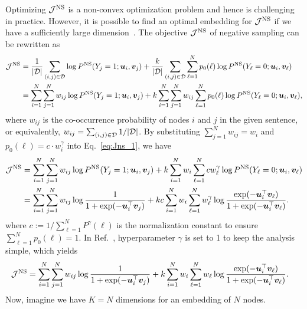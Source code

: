 \documentclass[12pt]{article} %
\def\vec#1{{\bm #1}}
\begin{document}
Optimizing ${\cal J}^{\text{NS}}$ is a non-convex optimization problem and hence is challenging in practice.
However, it is possible to find an optimal embedding for ${\cal J}^{\text{NS}}$ if we have a sufficiently large dimension~\cite{Levy2014}.
The objective ${\cal J}^{\text{NS}}$ of negative sampling can be rewritten as
\begin{align}
    \label{eq:Jns_1}
    {\cal J}^{\text{NS}} & = \frac{1}{|{\cal D}|}\sum_{(i,j) \in {\cal D}} \log P^{\text{NS}}(Y_{j} = 1; \vec{u}_{i}, \vec{v}_j) + \frac{k}{|{\cal D}|}\sum_{(i,j) \in {\cal D}} \sum_{\ell=1}^N p_0(\ell) \log P^{\text{NS}}(Y_{\ell} = 0; \vec{u}_{i}, \vec{v}_\ell) \nonumber \\
                         & = \sum_{i=1}^N \sum_{j=1}^N w_{ij} \log P^{\text{NS}}(Y_{j} = 1; \vec{u}_{i}, \vec{v}_j) + k\sum_{i=1}^N \sum_{j=1}^N w_{ij}\sum_{\ell=1}^N p_0 (\ell)\log P^{\text{NS}}(Y_{\ell} = 0; \vec{u}_{i}, \vec{v}_\ell),
\end{align}
where $w_{ij}$ is the co-occurrence probability of nodes $i$ and $j$ in the given sentence, or equivalently, $w_{ij}=\sum_{(i,j) \in {\cal D}} 1 / |{\cal D}|$.
By substituting $\sum_{j=1}^N w_{ij}=w_i$ and $p_0(\ell) = c \cdot w^{\gamma} _i$ into Eq.~\eqref{eq:Jns_1}, we have
\begin{align}
{\cal J}^{\text{NS}}
                         & = \sum_{i=1}^N \sum_{j=1}^N w_{ij} \log P^{\text{NS}}(Y_{j} = 1; \vec{u}_{i}, \vec{v}_j) + k\sum_{i=1}^N w_i\sum_{\ell=1}^N cw^\gamma _\ell \log P^{\text{NS}}(Y_{\ell} = 0; \vec{u}_{i}, \vec{v}_\ell) \nonumber \\
                         & = \sum_{i=1}^N \sum_{j=1}^N w_{ij} \log \frac{1}{1 + \exp(-\vec{u}^\top _i \vec{v}_j)} + kc\sum_{i=1}^N w_i\sum_{\ell=1}^N w^\gamma _\ell \log \frac{\exp(-\vec{u}^\top _i \vec{v}_\ell)}{1 + \exp(-\vec{u}^\top _i \vec{v}_\ell)}.
\end{align}
where $c:=1/\sum_{\ell=1}^N P^\gamma (\ell) $ is the normalization constant to ensure $\sum_{\ell=1}^N p_0(\ell)=1$.
In Ref.~\cite{Levy2014}, hyperparameter $\gamma$ is set to 1 to keep the analysis simple, which yields
\begin{align}
    {\cal J}^{\text{NS}}
                         & = \sum_{i=1}^N \sum_{j=1}^N w_{ij} \log \frac{1}{1 + \exp(-\vec{u}^\top _i \vec{v}_j)} + k\sum_{i=1}^N w_{i}\sum_{\ell=1}^N w_\ell \log \frac{\exp(-\vec{u}^\top _i \vec{v}_\ell)}{1 + \exp(-\vec{u}^\top _i \vec{v}_\ell)}.
\end{align}
Now, imagine we have $K=N$ dimensions for an embedding of $N$ nodes.
\end{document}
